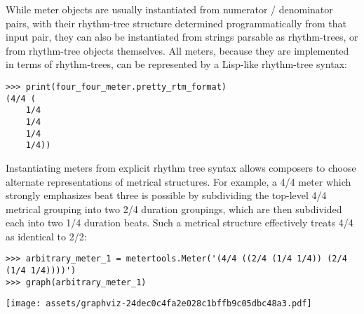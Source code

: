 \noindent While meter objects are usually instantiated from numerator /
denominator pairs, with their rhythm-tree structure determined programmatically
from that input pair, they can also be instantiated from strings parsable as
rhythm-trees, or from rhythm-tree objects themselves. All meters, because they
are implemented in terms of rhythm-trees, can be represented by a Lisp-like
rhythm-tree syntax:

\begin{comment}
<abjad>
print(four_four_meter.pretty_rtm_format)
</abjad>
\end{comment}

\begin{abjadbookoutput}
\begin{singlespacing}
\vspace{-0.5\baselineskip}
\begin{verbatim}
>>> print(four_four_meter.pretty_rtm_format)
(4/4 (
	1/4
	1/4
	1/4
	1/4))
\end{verbatim}
\end{singlespacing}
\end{abjadbookoutput}

\noindent Instantiating meters from explicit rhythm tree syntax allows
composers to choose alternate representations of metrical structures. For
example, a 4/4 meter which strongly emphasizes beat three is possible by
subdividing the top-level 4/4 metrical grouping into two 2/4 duration
groupings, which are then subdivided each into two 1/4 duration beats. Such a
metrical structure effectively treats 4/4 as identical to 2/2:

\begin{comment}
<abjad>
arbitrary_meter_1 = metertools.Meter('(4/4 ((2/4 (1/4 1/4)) (2/4 (1/4 1/4))))')
graph(arbitrary_meter_1)
</abjad>
\end{comment}

\begin{abjadbookoutput}
\begin{singlespacing}
\vspace{-0.5\baselineskip}
\begin{verbatim}
>>> arbitrary_meter_1 = metertools.Meter('(4/4 ((2/4 (1/4 1/4)) (2/4 (1/4 1/4))))')
>>> graph(arbitrary_meter_1)
\end{verbatim}
\noindent\texttt{[image: assets/graphviz-24dec0c4fa2e028c1bffb9c05dbc48a3.pdf]}
\end{singlespacing}
\end{abjadbookoutput}

